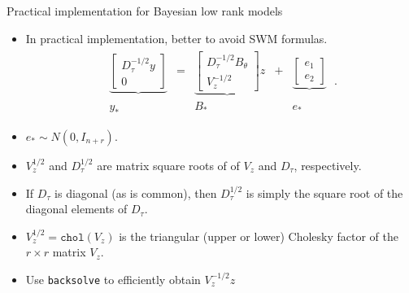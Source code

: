 \begin{frame}{Practical implementation for Bayesian low rank models}

\begin{itemize}\setlength{\itemsep}{0.cm}
\item In practical implementation, better to avoid SWM formulas.
 \begin{align*}\label{eq: Normal_Normal_Linear_Model}
 \begin{array}{ccccc}
  \underbrace{\begin{bmatrix} D_{\tau}^{-1/2}y \\ 0\end{bmatrix}} & = & \underbrace{\begin{bmatrix} D_{\tau}^{-1/2} B_{\theta} \\ V_z^{-1/2} \end{bmatrix}}{z} & + & \underbrace{\begin{bmatrix} e_1 \\ e_2\end{bmatrix}} \\
  y_{\ast} &  & B_{\ast} & & e_{\ast} 
 \end{array}\;.
 \end{align*}
\item $e_{\ast} \sim N(0, I_{n+r})$. 
 
\item $V_z^{1/2}$ and $D_{\tau}^{1/2}$ are matrix square roots of of $V_z$ and $D_{\tau}$, respectively. 

\item If $D_{\tau}$ is diagonal (as is common), then $D_{\tau}^{1/2}$ is simply the square root of the diagonal elements of $D_{\tau}$. 

\item $V_z^{1/2} = \texttt{chol}(V_z)$ is the triangular (upper or lower) Cholesky factor of the $r\times r$ matrix $V_{z}$. 

\item Use \texttt{backsolve} to efficiently obtain $V_z^{-1/2}z$ 

% 
\end{itemize}

\end{frame}

